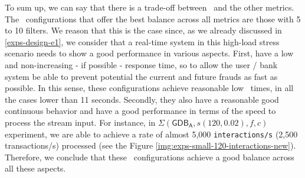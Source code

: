 To sum up, we can say that there is a trade-off between \MRT\ and the other metrics. The \DPATM\ configurations that offer the best balance across all metrics are those with 5 to 10 filters. We reason that this is the case since, as we already discussed in \ref{exps-design-e1}, we consider that a real-time system in this high-load stress scenario needs to show a good performance in various aspects. First, have a low and non-increasing - if possible - response time, so to allow the user / bank system be able to prevent potential the current and future frauds as fast as possible. In this sense, these configurations achieve reasonable low \MRT\ times, in all the cases lower than 11 seconds. Secondly, they also have a reasonable good continuous behavior and have a good performance in terms of the speed to process the stream input. For instance, in $\Sigma(\mathsf{GDB_A}, s(120, 0.02), f, c)$ experiment, we are able to achieve a rate of almost 5,000 \texttt{interactions/s} (2,500 transactions/s) processed (see the Figure \ref{img:exps-small-120-interactions-new}).
Therefore, we conclude that these \DPATM\ configurations achieve a good balance across all these aspects.